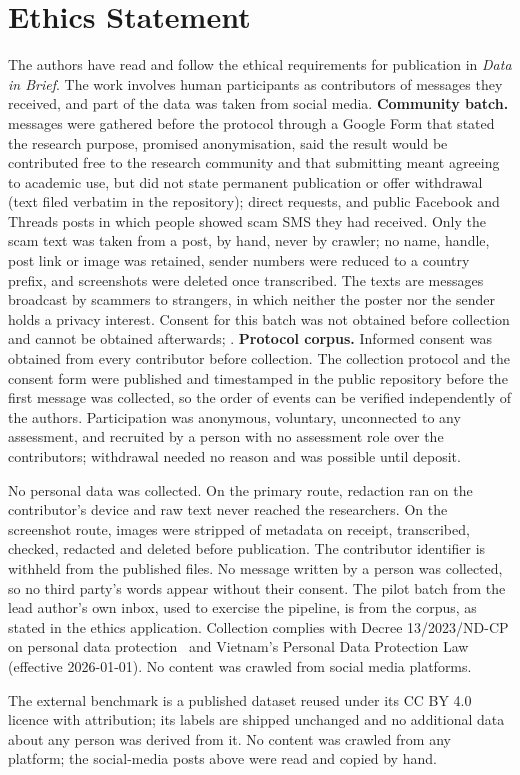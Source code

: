 \section*{Ethics Statement}
The authors have read and follow the ethical requirements for publication in \emph{Data in
Brief}. The work involves human participants as contributors of messages they received, and part
of the data was taken from social media. \textbf{Community batch.} 
messages were gathered before the protocol through a Google Form that stated the research purpose, promised anonymisation, said the
result would be contributed free to the research community and that submitting meant agreeing
to academic use, but did not state permanent publication or offer withdrawal (text filed
verbatim in the repository); direct requests, and public Facebook and Threads posts in which people showed scam
SMS they had received. Only the scam text was taken from a post, by hand, never by crawler; no
name, handle, post link or image was retained, sender numbers were reduced to a country prefix,
and screenshots were deleted once transcribed. The texts are messages broadcast by scammers to
strangers, in which neither the poster nor the sender holds a privacy interest. Consent for this
batch was not obtained before collection and cannot be obtained afterwards; . \textbf{Protocol
corpus.}
 Informed consent was obtained from every contributor
before collection. The collection protocol and the consent form were published and timestamped
in the public repository before the first message was collected, so the order of events can be
verified independently of the authors. Participation was anonymous, voluntary, unconnected to
any assessment, and recruited by a person with no assessment role over the contributors;
withdrawal needed no reason and was possible until deposit.

No personal data was collected. On the primary route, redaction ran on the contributor's
device and raw text never reached the researchers. On the screenshot route, images were
stripped of metadata on receipt, transcribed, checked, redacted and deleted before publication.
The contributor identifier is withheld from the published files. No message written by a
person was collected, so no third party's words appear without their consent. The pilot batch
from the lead author's own inbox, used to exercise the pipeline, is 
from the corpus, as stated in the ethics application. Collection complies with Decree
13/2023/ND-CP on personal data protection~\cite{decree13_sms} and Vietnam's Personal Data
Protection Law (effective 2026-01-01). No content was crawled from social media platforms.

The external benchmark is a published dataset reused under its CC BY 4.0 licence with
attribution; its labels are shipped unchanged and no additional data about any person was
derived from it. No content was crawled from any platform; the social-media posts above were
read and copied by hand.
